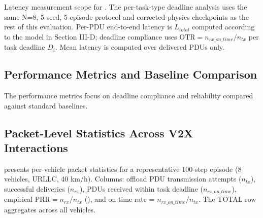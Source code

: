 \documentclass[journal,10pt,twocolumn]{IEEEtran}
\begin{document}
Latency measurement scope for . The per-task-type deadline analysis uses the same N=8, 5-seed, 5-episode protocol and corrected-physics checkpoints as the rest of this evaluation. Per-PDU end-to-end latency is $L_{total}$ computed according to the model in Section III-D; deadline compliance uses $\text{OTR} = n_{rx\_on\_time}/n_{tx}$ per task deadline $D_i$. Mean latency is computed over delivered PDUs only.


\subsection{Performance Metrics and Baseline Comparison}

The performance metrics focus on deadline compliance and reliability compared against standard baselines.

\subsection{Packet-Level Statistics Across V2X Interactions}

 presents per-vehicle packet statistics for a representative 100-step episode (8 vehicles, URLLC, 40 km/h). Columns: offload PDU transmission attempts ($n_{tx}$), successful deliveries ($n_{rx}$), PDUs received within task deadline ($n_{rx\_on\_time}$), empirical $\text{PRR} = n_{rx}/n_{tx}$ (), and on-time rate = $n_{rx\_on\_time}/n_{tx}$. The TOTAL row aggregates across all vehicles.
\end{document}

